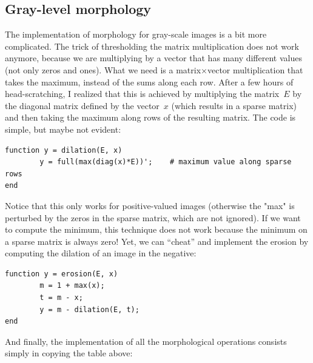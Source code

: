 \begin{gallery}
\end{gallery}

\subsection{Gray-level morphology}


The implementation of morphology for gray-scale images is a bit more
complicated.  The trick of thresholding the matrix multiplication does not
work anymore, because we are multiplying by a vector that has many different
values (not only zeros and ones).  What we need is a matrix$\times$vector
multiplication that takes the maximum, instead of the sums along each row.
After a few hours of head-scratching, I realized that this is achieved by
multiplying the matrix~$E$ by the diagonal matrix defined by the vector~$x$
(which results in a sparse matrix) and then taking the maximum along rows of
the resulting matrix.  The code is simple, but maybe not evident:

\begin{verbatim}
function y = dilation(E, x)
        y = full(max(diag(x)*E))';    # maximum value along sparse rows
end
\end{verbatim}

Notice that this only works for positive-valued images (otherwise the "max"
is perturbed by the zeros in the sparse matrix, which are not ignored).  If
we want to compute the minimum, this technique does not work because the
minimum on a sparse matrix is always zero!  Yet, we can ``cheat'' and
implement the erosion by computing the dilation of an image in the negative:

\begin{verbatim}
function y = erosion(E, x)
        m = 1 + max(x);
        t = m - x;
        y = m - dilation(E, t);
end
\end{verbatim}

And finally, the implementation of all the morphological operations consists
simply in copying the table above:

